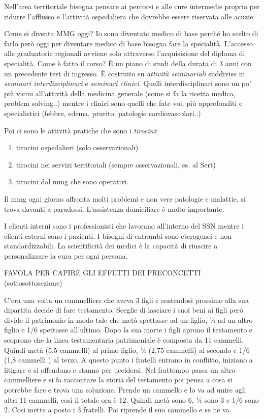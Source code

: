 \documentclass[]{article}
\begin{document}
Nell'area territoriale bisogna pensare ai percorsi e alle cure
intermedie proprio per ridurre l'afflusso e l'attività ospedaliera che
dovrebbe essere riservata alle acuzie.

Come si diventa MMG oggi? Io sono diventato medico di base perché ho
scelto di farlo però oggi per diventare medico di base bisogna fare la
specialità. L'accesso alle graduatorie regionali avviene solo attraverso
l'acquisizione del diploma di specialità. Come è fatto il corso? È un
piano di studi della durata di 3 anni con un precedente test di
ingresso. È costruito su \emph{attività seminariali} suddivise in
\emph{seminari interdisciplinari} e \emph{seminari clinici}. Quelli
interdisciplinari sono un po' più vicini all'attività della medicina
generale (come si fa la ricetta medica, problem solving..) mentre i
clinici sono quelli che fate voi, più approfonditi e specialistici
(febbre, edema, prurito, patologie cardiovascolari..)

Poi ci sono le attività pratiche che sono i \emph{tirocini}:

\begin{enumerate}
\def\labelenumi{\arabic{enumi}.}
\item
  tirocini ospedalieri (solo osservazionali)
\item
  tirocini nei servizi territoriali (sempre osservazionali, es. al Sert)
\item
  tirocini dal mmg che sono operativi.
\end{enumerate}

Il mmg ogni giorno affronta molti problemi e non vere patologie e
malattie, si trova davanti a paradossi. L'assistenza domiciliare è molto
importante.

I clienti interni sono i professionisti che lavorano all'interno del SSN
mentre i clienti esterni sono i pazienti. I bisogni di entrambi sono
eterogenei e non standardizzabili. La scientificità dei medici è la
capacità di riuscire a personalizzare la cura per ogni persona.

FAVOLA PER CAPIRE GLI EFFETTI DEI PRECONCETTI (sottosottosezione)

C'era una volta un cammelliere che aveva 3 figli e sentendosi prossimo
alla sua dipartita decide di fare testamento. Sceglie di lasciare i suoi
beni ai figli però divide il patrimonio in modo tale che metà spettasse
ad un figlio, ¼ ad un altro figlio e 1/6 spettasse all'ultimo. Dopo la
sua morte i figli aprono il testamento e scoprono che la linea
testamentaria patrimoniale è composta da 11 cammelli. Quindi metà (5,5
cammelli) al primo figlio, ¼ (2,75 cammelli) al secondo e 1/6 (1,8
cammelli ) al terzo. A questo punto i fratelli entrano in conflitto,
iniziano a litigare e si offendono e stanno per uccidersi. Nel frattempo
passa un altro cammelliere e si fa raccontare la storia del testamento
poi pensa a cosa si potrebbe fare e trova una soluzione. Prende un
cammello e lo va ad unire agli altri 11 cammelli, così il totale ora è
12. Quindi metà sono 6, ¼ sono 3 e 1/6 sono 2. Cosi mette a posto i 3
fratelli. Poi riprende il suo cammello e se ne va.
\end{document}
